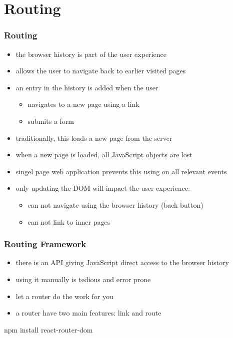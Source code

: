 \section{Routing}
\begin{frame}[fragile] \frametitle{Routing}
\begin{itemize}
  \item the browser history is part of the user experience
  \item allows the user to navigate back to earlier visited pages
  \item an entry in the history is added when the user
  \begin{itemize}
    \item navigates to a new page using a link
    \item submits a form
  \end{itemize}
  \item traditionally, this loads a new page from the server
  \item when a new page is loaded, all JavaScript objects are lost
  \item singel page web application prevents this using  on all relevant events
  \item only updating the DOM will impact the user experience:
  \begin{itemize}
    \item can not navigate using the browser history (back button)
    \item can not link to inner pages
  \end{itemize}
\end{itemize}
\end{frame}

\begin{frame}[fragile] \frametitle{Routing Framework}
\begin{itemize}
  \item there is an API giving JavaScript direct access to the browser history
  \item using it manually is tedious and error prone
  \item let a router do the work for you
  \item a router have two main features: link and route
\end{itemize}

\vspace{10mm}
\begin{CodeBox}{}
npm install react-router-dom
\end{CodeBox}
\end{frame}

